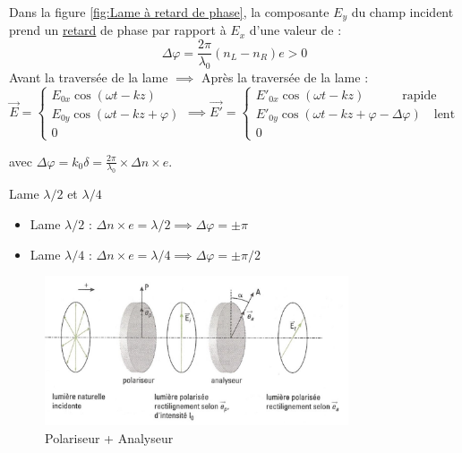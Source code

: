 \begin{Prop}{}{} 
  Dans la figure \ref{fig:Lame à retard de phase}, la composante $E_y$ du champ incident prend un \underline{retard} de phase par rapport à $E_x$ d'une valeur de : 
\begin{equation}
  \Delta \varphi = \frac{2 \pi}{\lambda_0}  (n_L - n_R)e >0
\end{equation}
Avant la traversée de la lame $\implies$ Après la traversée de la lame :
\begin{equation}
  \overrightarrow{E} = \begin{cases} 
    E _{0x}  \cos ( \omega t - kz) \\ 
    E _{0y} \cos ( \omega t - kz + \varphi) \\ 
    0
  \end{cases} \implies 
  \overrightarrow{E'} = \begin{cases}
    E' _{0x}  \cos ( \omega t - kz) \quad\quad\quad\text{rapide}\\ 
    E' _{0y} \cos ( \omega t - kz + \varphi - \Delta \varphi) \quad\text{lent}\\ 
    0
  \end{cases}
\end{equation}

avec $\Delta \varphi = k_0 \delta = \frac{2 \pi}{\lambda_0} \times \Delta n \times e$. 
\end{Prop}

\begin{Definition}[colbacktitle=red!75!black]{Lame $\lambda/2$ et $\lambda/4$}{}
  \begin{itemize}

      \item Lame $\lambda/2$ : $\Delta n \times e = \lambda/2 \implies \Delta \varphi = \pm \pi$
      \item Lame $\lambda/4$ : $\Delta n \times e = \lambda/4 \implies \Delta \varphi = \pm \pi/2$

  \end{itemize}
\end{Definition}

\begin{figure}[H] %
  \centering
  \includegraphics[width=0.8\textwidth]{./assets/Polariseur + Analyseur.png}
  \caption{Polariseur + Analyseur}
  \label{fig:Polariseur + Analyseur}
\end{figure}

